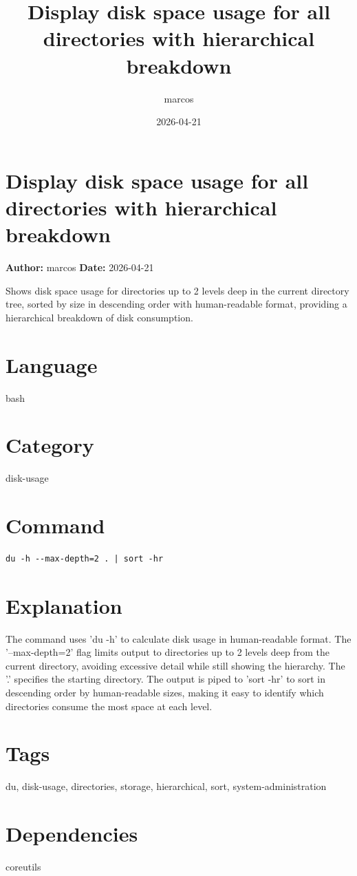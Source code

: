 \documentclass{article}
\title{Display disk space usage for all directories with hierarchical breakdown}
\author{marcos}
\date{2026-04-21}
\begin{document}
\section*{Display disk space usage for all directories with hierarchical breakdown}
\textbf{Author:} marcos \hfill \textbf{Date:} 2026-04-21

\noindent Shows disk space usage for directories up to 2 levels deep in the current directory tree, sorted by size in descending order with human-readable format, providing a hierarchical breakdown of disk consumption.

\section*{Language}
bash

\section*{Category}
disk-usage

\section*{Command}
\begin{lstlisting}
du -h --max-depth=2 . | sort -hr
\end{lstlisting}

\section*{Explanation}
The command uses 'du -h' to calculate disk usage in human-readable format. The '--max-depth=2' flag limits output to directories up to 2 levels deep from the current directory, avoiding excessive detail while still showing the hierarchy. The '.' specifies the starting directory. The output is piped to 'sort -hr' to sort in descending order by human-readable sizes, making it easy to identify which directories consume the most space at each level.

\section*{Tags}
du, disk-usage, directories, storage, hierarchical, sort, system-administration

\section*{Dependencies}
coreutils
\end{document}
